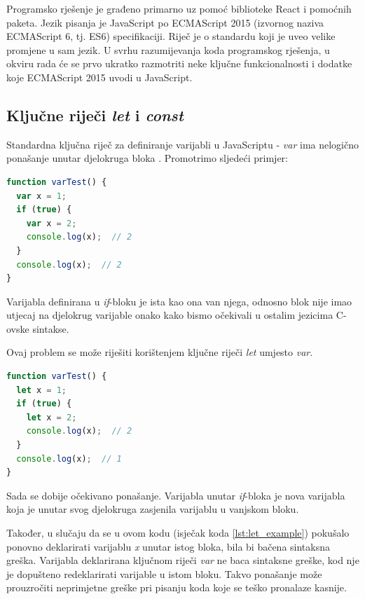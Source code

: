 \documentclass[times, utf8, zavrsni, numeric]{fer}
\newcommand{\razmakp}{\vspace{18pt}}
\newcommand{\razmaks}{\vspace{10pt}}
\begin{document}
Programsko rješenje je građeno primarno uz pomoć biblioteke React i pomoćnih paketa.
Jezik pisanja je JavaScript po ECMAScript 2015 (izvornog naziva ECMAScript 6, tj. ES6) specifikaciji.
Riječ je o standardu koji je uveo velike promjene u sam jezik.
U svrhu razumijevanja koda programskog rješenja, u okviru rada će se prvo ukratko razmotriti neke ključne funkcionalnosti i dodatke koje ECMAScript 2015 uvodi u JavaScript.


\subsection{Ključne riječi \emph{let} i \emph{const}}

Standardna ključna riječ za definiranje varijabli u JavaScriptu - \emph{var} ima nelogično ponašanje unutar djelokruga bloka . Promotrimo sljedeći primjer:

\razmakp
\begin{lstlisting}[language=JavaScript, caption={Primjer djelokruga \emph{var} varijable}]
function varTest() {
  var x = 1;
  if (true) {
    var x = 2;
    console.log(x);  // 2
  }
  console.log(x);  // 2
}
\end{lstlisting}
\razmaks

Varijabla definirana u \emph{if}-bloku je ista kao ona van njega, odnosno blok nije imao utjecaj na djelokrug varijable onako kako bismo očekivali u ostalim jezicima C-ovske sintakse.
\razmakp

Ovaj problem se može riješiti korištenjem ključne riječi \emph{let} umjesto \emph{var}.\citep{MDNLet}

\razmakp
\begin{lstlisting}[language=JavaScript, caption={Primjer djelokruga \emph{let} varijable}, label={lst:let_example}]
function varTest() {
  let x = 1;
  if (true) {
    let x = 2;
    console.log(x);  // 2
  }
  console.log(x);  // 1
}
\end{lstlisting}
\razmaks

Sada se dobije očekivano ponašanje. Varijabla unutar \emph{if}-bloka je nova varijabla koja je unutar svog djelokruga zasjenila varijablu u vanjskom bloku.

Također, u slučaju da se u ovom kodu (isječak koda \ref{lst:let_example}) pokušalo ponovno deklarirati varijablu \emph{x} unutar istog bloka, bila bi bačena sintaksna greška.
Varijabla deklarirana ključnom riječi \emph{var} ne baca sintaksne greške, kod nje je dopušteno redeklarirati varijable u istom bloku.
Takvo ponašanje može prouzročiti neprimjetne greške pri pisanju koda koje se teško pronalaze kasnije.
\end{document}
